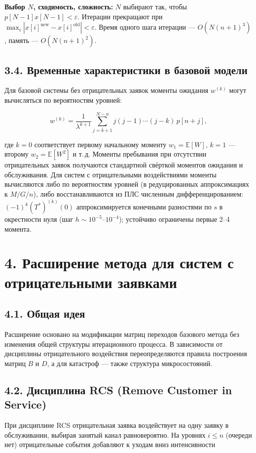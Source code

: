 \textbf{Выбор \(N\), сходимость, сложность:} \(N\) выбирают так, чтобы \(p[N-1]x[N-1]<\varepsilon\). Итерации прекращают при \(\max_i\left|{x[i]}^{\mathrm{new}}-{x[i]}^{\mathrm{old}}\right|<\varepsilon\). Время одного шага итерации --- \(O(N(n+1)^3)\), память --- \(O(N(n+1)^2)\).

\subsection*{3.4. Временные характеристики в базовой модели}
Для базовой системы без отрицательных заявок моменты ожидания \(w^{(k)}\) могут вычисляться по вероятностям уровней:


\[w^{(k)} = \frac{1}{\lambda^{k+1}} \sum_{j=k+1}^{N-n} j (j-1)\cdots(j-k)\, p[n+j],\]


где \(k=0\) соответствует первому начальному моменту \(w_1=\mathbb{E}[W]\), \(k=1\) --- второму \(w_2=\mathbb{E}[W^2]\) и т.\,д. Моменты пребывания при отсутствии отрицательных заявок получаются стандартной свёрткой моментов ожидания и обслуживания. Для систем с отрицательными воздействиями моменты вычисляются либо по вероятностям уровней (в редуцированных аппроксимациях к \(M/G/n\)), либо восстанавливаются из ПЛС численным дифференцированием: \((-1)^k \left(T^*\right)^{(k)}(0)\) аппроксимируется конечными разностями по \(s\) в окрестности нуля (шаг \(h\sim 10^{-5}\)--\(10^{-4}\)); устойчиво ограничены первые 2--4 момента.




\section*{4. Расширение метода для систем с отрицательными заявками}
\subsection*{4.1. Общая идея}
Расширение основано на модификации матриц переходов базового метода без изменения общей структуры итерационного процесса. В зависимости от дисциплины отрицательного воздействия переопределяются правила построения матриц \(B\) и \(D\), а для катастроф --- также структура микросостояний.

\subsection*{4.2. Дисциплина RCS (Remove Customer in Service)}
При дисциплине RCS отрицательная заявка воздействует на одну заявку в обслуживании, выбирая занятый канал равновероятно. На уровнях \(i\le n\) (очереди нет) отрицательные события добавляют к уходам вниз интенсивности


